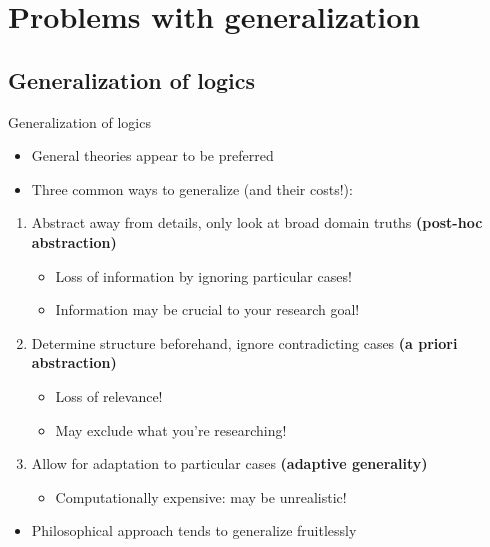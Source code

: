 \documentclass[10pt,a4paper]{beamer}
\begin{document}
\section{Problems with generalization}

\subsection{Generalization of logics}

\begin{frame}{Generalization of logics}
\begin{itemize}
\item General theories appear to be preferred
\item Three common ways to generalize (and their costs!):
\end{itemize}
\begin{enumerate}
\item Abstract away from details, only look at broad domain truths \textbf{(post-hoc abstraction)}
\begin{itemize}
\item Loss of information by ignoring particular cases!
\item Information may be crucial to your research goal!
\end{itemize}
\item Determine structure beforehand, ignore contradicting cases \textbf{(a priori abstraction)}
\begin{itemize}
\item Loss of relevance!
\item May exclude what you're researching!
\end{itemize}
\item Allow for adaptation to particular cases \textbf{(adaptive generality)}
\begin{itemize}
\item Computationally expensive: may be unrealistic!
\end{itemize}
\end{enumerate}
\begin{itemize}
\item Philosophical approach tends to generalize fruitlessly
\end{itemize}
\end{frame}
\end{document}
